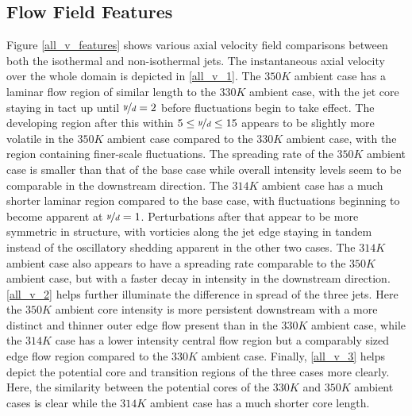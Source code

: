 \subsection{Flow Field Features}
Figure \ref{all_v_features} shows various axial velocity field comparisons between both the isothermal and non-isothermal jets. The instantaneous axial velocity over the whole domain is depicted in \ref{all_v_1}. The $350 K$ ambient case has a laminar flow region of similar length to the $330 K $ ambient case, with the jet core staying in tact up until $\nicefrac{y}{d} = 2$ before fluctuations begin to take effect. The developing region after this within $5 \leq \nicefrac{y}{d} \leq 15$ appears to be slightly more volatile in the $350 K$ ambient case compared to the $330 K$ ambient case, with the region containing finer-scale fluctuations. The spreading rate of the $350 K$ ambient case is smaller than that of the base case while overall intensity levels seem to be comparable in the downstream direction. The $314 K$ ambient case has a much shorter laminar region compared to the base case, with fluctuations beginning to become apparent at $\nicefrac{y}{d} = 1$. Perturbations after that appear to be more symmetric in structure, with vorticies along the jet edge staying in tandem instead of the oscillatory shedding apparent in the other two cases. The $314 K$ ambient case also appears to have a spreading rate comparable to the $350 K$ ambient case, but with a faster decay in intensity in the downstream direction. \ref{all_v_2} helps further illuminate the difference in spread of the three jets. Here the $350 K$ ambient core intensity is more persistent downstream with a more distinct and thinner outer edge flow present than in the $330 K$ ambient case, while the $314 K$ case has a lower intensity central flow region but a comparably sized edge flow region compared to the $330 K$ ambient case. Finally, \ref{all_v_3} helps depict the potential core and transition regions of the three cases more clearly. Here, the similarity between the potential cores of the $330 K$ and $350 K$ ambient cases is clear while the $314 K$ ambient case has a much shorter core length. 

